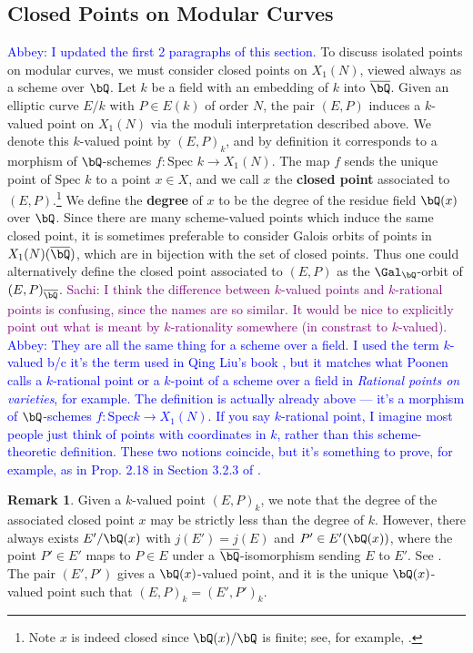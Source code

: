 \documentclass[11pt,reqno]{amsart}
\theoremstyle{plain}
\theoremstyle{definition}
\newtheorem{remark}[theorem]{Remark}
\newcommand{\Q}{\bQ}
\newcommand{\abbey}[1]{\textcolor{blue}{Abbey: #1}}
\newcommand{\sachi}[1]{\textcolor{purple}{Sachi: #1}}
\begin{document}
\subsection{Closed Points on Modular Curves}\abbey{I updated the first 2 paragraphs of this section.} To discuss isolated points on modular curves, we must consider closed points on $X_1(N)$, viewed always as a scheme over $\Q$. Let $k$ be a field with an embedding of $k$ into $\overline \Q$. Given an elliptic curve $E/k$ with $P \in E(k)$ of order $N$, the pair $(E,P)$ induces a $k$-valued point on $X_1(N)$ via the moduli interpretation described above. We denote this $k$-valued point by $(E,P)_k$, and by definition it corresponds to a morphism of $\Q$-schemes $f:\text{Spec } k \rightarrow X_1(N)$. The map $f$ sends the unique point of $\text{Spec } k$ to a point $x \in X$, and we call $x$ the \textbf{closed point} associated to $(E,P)$.\footnote{Note $x$ is indeed closed since $\Q(x)/\Q$ is finite; see, for example, \cite[Exercise 5.9, p.76] {Liu2002}.} We define the \textbf{degree} of $x$ to be the degree of the residue field $\Q(x)$ over $\Q$. Since there are many scheme-valued points which induce the same closed point, it is sometimes preferable to consider Galois orbits of points in $X_1(N)(\overline{\Q})$, which are in bijection with the set of closed points. Thus one could alternatively define the closed point associated to $(E,P)$ as the $\Gal_\Q$-orbit of $(E,P)_{\overline{\Q}}$. \sachi{I think the difference between $k$-valued points and $k$-rational points is confusing, since the names are so similar. It would be nice to explicitly point out what is meant by $k$-rationality somewhere (in constrast to $k$-valued).} \abbey{They are all the same thing for a scheme over a field. I used the term $k$-valued b/c it's the term used in Qing Liu's book \cite{Liu2002}, but it matches what Poonen calls a $k$-rational point or a $k$-point of a scheme over a field in \emph{Rational points on varieties}, for example. The definition is actually already above --- it's a morphism of $\Q$-schemes $f:\text{Spec} k \rightarrow X_1(N)$. If you say $k$-rational point, I imagine most people just think of points with coordinates in $k$, rather than this scheme-theoretic definition. These two notions coincide, but it's something to prove, for example, as in Prop. 2.18 in Section 3.2.3 of \cite{Liu2002}.}

\begin{remark} Given a $k$-valued point $(E,P)_k$, we note that the degree of the associated closed point $x$ may be strictly less than the degree of $k$. However, there always exists $E'/\Q(x)$ with $j(E')=j(E)$ and $P' \in E'(\Q(x))$, where the point $P' \in E'$ maps to $P \in E$ under a $\overline \Q$-isomorphism sending $E$ to $E'$. See \cite[p. 274, Proposition VI.3.2]{DR}. The pair $(E',P')$ gives a $\Q(x)$-valued point, and it is the unique $\Q(x)$-valued point such that $(E,P)_{k}=(E',P')_{k}.$
\end{remark}
\end{document}
